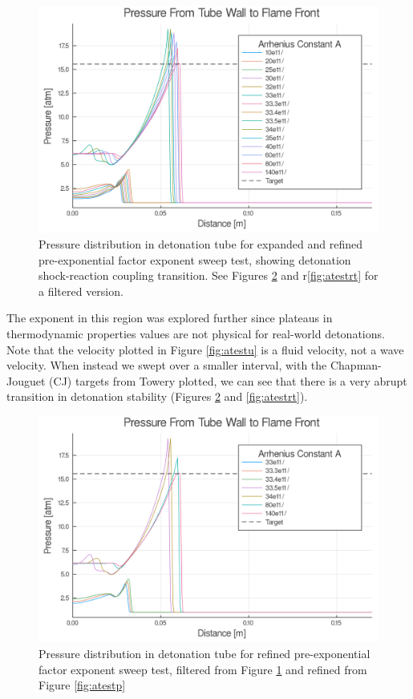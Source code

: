 \begin{figure}
\centering
\includegraphics[width=0.85\linewidth]{./figs/Atest_refined/p_large.png}
\caption{Pressure distribution in detonation tube for expanded and refined pre-exponential factor exponent sweep test, showing detonation shock-reaction coupling transition. See Figures \ref{fig:atestrp} and r\ref{fig:atestrt} for a filtered version.}
\label{fig:pjump}
\end{figure}


The exponent in this region was explored further since plateaus in thermodynamic properties values are not physical for real-world detonations. Note that the velocity plotted in Figure \ref{fig:atestu} is a fluid velocity, not a wave velocity. When instead we swept over a smaller interval, with the Chapman-Jouguet (CJ) targets from Towery\cite{towery1} plotted, we can see that there is a very abrupt transition in detonation stability (Figures \ref{fig:atestrp} and \ref{fig:atestrt}). 

\begin{figure}
\centering
\includegraphics[width=0.85\linewidth]{./figs/Atest_refined/p.png}
\caption{Pressure distribution in detonation tube for refined pre-exponential factor exponent sweep test, filtered from Figure \ref{fig:pjump} and refined from Figure \ref{fig:atestp}}
\label{fig:atestrp}
\end{figure}

